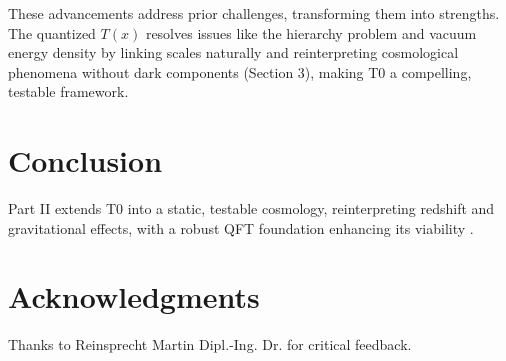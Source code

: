 \documentclass[12pt,a4paper]{article}
\newenvironment{acknowledgments}
{\section*{Acknowledgments}}
{\vspace{1em}}
\newcommand{\Tfield}{T(x)}
\begin{document}
	These advancements address prior challenges, transforming them into strengths. The quantized \(\Tfield\) resolves issues like the hierarchy problem and vacuum energy density by linking scales naturally and reinterpreting cosmological phenomena without dark components (Section 3), making T0 a compelling, testable framework.
	
	\section{Conclusion}
	\label{sec:conclusion}
	
	Part II extends T0 into a static, testable cosmology, reinterpreting redshift and gravitational effects, with a robust QFT foundation enhancing its viability \cite{pascher_perspective_2025}.
	
	\begin{acknowledgments}
		Thanks to Reinsprecht Martin Dipl.-Ing. Dr. for critical feedback.
	\end{acknowledgments}
		
\end{document}
